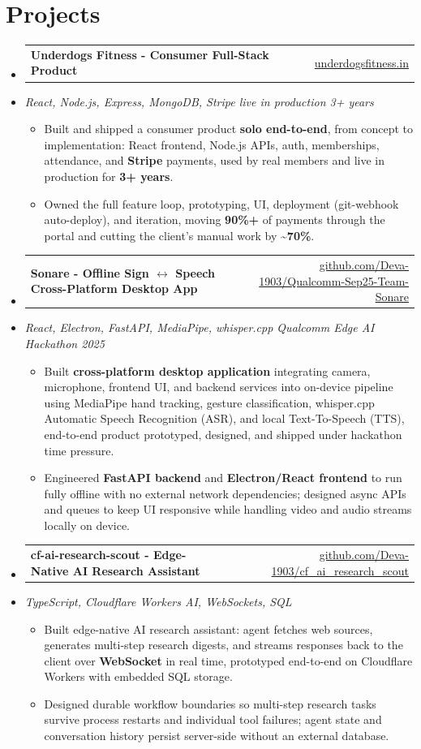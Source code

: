 \documentclass[letterpaper,10pt]{article}
\makeatletter
\newcommand{\resumeItem}[1]{
  \item\small{#1\vspace{-1pt}}
}
\newcommand{\resumeProjectHeading}[2]{
    \item
    \begin{tabular*}{0.985\textwidth}[t]{l@{\extracolsep{\fill}}r}
      \small\textbf{#1} & \small #2 \\
    \end{tabular*}\vspace{-5pt}
}
\newcommand{\resumeProjectSubheading}[1]{
  \vspace{-2pt}\item[] {\small\textcolor{ResumeSlate}{\emph{#1}}}\vspace{-3pt}
}
\newcommand{\resumeSubHeadingListStart}{\begin{itemize}[leftmargin=0.0in, label={}, itemsep=2pt, topsep=2pt]}
\newcommand{\resumeSubHeadingListEnd}{\end{itemize}}
\newcommand{\resumeItemListStart}{\begin{itemize}[leftmargin=0.18in, itemsep=2pt, topsep=1pt]}
\newcommand{\resumeItemListEnd}{\end{itemize}\vspace{-4pt}}
\makeatother
\begin{document}
\section{Projects}
\resumeSubHeadingListStart
  \resumeProjectHeading
    {Underdogs Fitness - Consumer Full-Stack Product}
    {\href{https://www.underdogsfitness.in}{underdogsfitness.in}}
  \resumeProjectSubheading{React, Node.js, Express, MongoDB, Stripe \enspace\textbar\enspace live in production 3+ years}
    \resumeItemListStart
      \resumeItem{Built and shipped a consumer product \textbf{solo end-to-end}, from concept to implementation: React frontend, Node.js APIs, auth, memberships, attendance, and \textbf{Stripe} payments, used by real members and live in production for \textbf{3+ years}.}
      \resumeItem{Owned the full feature loop, prototyping, UI, deployment (git-webhook auto-deploy), and iteration, moving \textbf{90\%+} of payments through the portal and cutting the client's manual work by \textbf{\textasciitilde70\%}.}
    \resumeItemListEnd
  \resumeProjectHeading
    {Sonare - Offline Sign \(\leftrightarrow\) Speech Cross-Platform Desktop App}
    {\href{https://github.com/Deva-1903/Qualcomm-Sep25-Team-Sonare}{github.com/Deva-1903/Qualcomm-Sep25-Team-Sonare}}
  \resumeProjectSubheading{React, Electron, FastAPI, MediaPipe, whisper.cpp \enspace\textbar\enspace Qualcomm Edge AI Hackathon 2025}
    \resumeItemListStart
      \resumeItem{Built \textbf{cross-platform desktop application} integrating camera, microphone, frontend UI, and backend services into on-device pipeline using MediaPipe hand tracking, gesture classification, whisper.cpp Automatic Speech Recognition (ASR), and local Text-To-Speech (TTS), end-to-end product prototyped, designed, and shipped under hackathon time pressure.}
      \resumeItem{Engineered \textbf{FastAPI backend} and \textbf{Electron/React frontend} to run fully offline with no external network dependencies; designed async APIs and queues to keep UI responsive while handling video and audio streams locally on device.}
    \resumeItemListEnd
  \resumeProjectHeading
    {cf-ai-research-scout - Edge-Native AI Research Assistant}
    {\href{https://github.com/Deva-1903/cf_ai_research_scout}{github.com/Deva-1903/cf\_ai\_research\_scout}}
  \resumeProjectSubheading{TypeScript, Cloudflare Workers AI, WebSockets, SQL}
    \resumeItemListStart
      \resumeItem{Built edge-native AI research assistant: agent fetches web sources, generates multi-step research digests, and streams responses back to the client over \textbf{WebSocket} in real time, prototyped end-to-end on Cloudflare Workers with embedded SQL storage.}
      \resumeItem{Designed durable workflow boundaries so multi-step research tasks survive process restarts and individual tool failures; agent state and conversation history persist server-side without an external database.}
    \resumeItemListEnd
\resumeSubHeadingListEnd
\vspace{-4pt}
\end{document}
